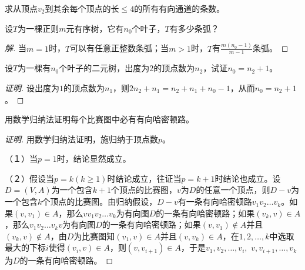 \documentclass{article}
\begin{document}
\begin{CJK}{UTF8}{gbsn}
\begin{Exercise}
求从顶点$v_2$到其余每个顶点的长$\leq 4$的所有有向通道的条数。 
\end{Exercise}
\begin{Exercise}
  设$T$为一棵正则$m$元有序树，它有$n_0$个叶子，$T$有多少条弧？
\end{Exercise}
\begin{proof}[解]
  当$m=1$时，$T$可以有任意正整数条弧；当$m>1$时，$T$有$\frac{m(n_0-1)}{m-1}$条弧。
\end{proof}
\begin{Exercise}
  设$T$为一棵有$n_0$个叶子的二元树，出度为$2$的顶点数为$n_2$，试证$n_0=n_2+1$。
\end{Exercise}
\begin{proof}[证明]
  设出度为$1$的顶点数为$n_1$，则$2n_2+n_1=n_2+n_1+n_0-1$，从而$n_0=n_2+1$。
\end{proof}
\begin{Exercise}
  用数学归纳法证明每个比赛图中必有有向哈密顿路。
\end{Exercise}
\begin{proof}[证明]
  用数学归纳法证明，施归纳于顶点数$p$。

  （１）当$p=1$时，结论显然成立。

  （２）假设当$p=k(k\geq 1)$时结论成立，往证当$p=k+1$时结论也成立。设$D=(V,A)$为一个包含$k+1$个顶点的比赛图，$v$为$D$的任意一个顶点，则$D-v$为一个包含$k$个顶点的比赛图。由归纳假设，$D-v$有一条有向哈密顿路$v_1v_2\ldots v_k$。如果$(v,v_1)\in A$，那么$vv_1v_2\ldots v_k$为有向图$D$的一条有向哈密顿路；如果$(v_k,v)\in A$，那么$v_1v_2\ldots v_kv$为有向图$D$的一条有向哈密顿路；如果$(v,v_1)\notin A$并且$(v_k,v)\notin A$，由$D$为比赛图知$(v_1,v)\in A$并且$(v,v_k)\in A$，在$1,2,\ldots, k$中选取最大的下标$i$使得$(v_i,v)\in A$，则$(v,v_{i+1})\in A$，于是$v_1, v_2,\ldots,v_i,$ $v,v_{i+1},\ldots,v_k$为$D$的一条有向哈密顿路。 
\end{proof}

\end{CJK}
\end{document}
